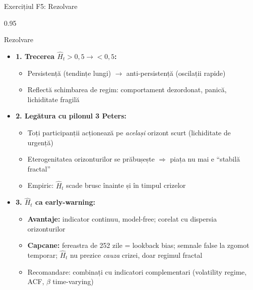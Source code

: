 \documentclass[9pt, aspectratio=169, t]{beamer}
\begin{document}
\begin{frame}[shrink=25]{Exercițiul F5: Rezolvare}
\begin{cminipage}{0.95\textwidth}
\begin{exampleblock}{Rezolvare}
\begin{itemize}\setlength{\itemsep}{0pt}
    \item \textbf{1. Trecerea $\hat H_t > 0{,}5 \to < 0{,}5$:}
    \begin{itemize}\setlength{\itemsep}{0pt}
        \item Persistență (tendințe lungi) $\to$ anti-persistență (oscilații rapide)
        \item Reflectă schimbarea de regim: comportament dezordonat, panică, lichiditate fragilă
    \end{itemize}
    \item \textbf{2. Legătura cu pilonul 3 Peters:}
    \begin{itemize}\setlength{\itemsep}{0pt}
        \item Toți participanții acționează pe \emph{același} orizont scurt (lichiditate de urgență)
        \item Eterogenitatea orizonturilor se prăbușește $\Rightarrow$ piața nu mai e ``stabilă fractal''
        \item Empiric: $\hat H_t$ scade brusc înainte și în timpul crizelor
    \end{itemize}
    \item \textbf{3. $\hat H_t$ ca early-warning:}
    \begin{itemize}\setlength{\itemsep}{0pt}
        \item \textbf{Avantaje:} indicator continuu, model-free; corelat cu dispersia orizonturilor
        \item \textbf{Capcane:} fereastra de 252 zile = lookback bias; semnale false la zgomot temporar; $\hat H_t$ nu prezice \emph{cauza} crizei, doar regimul fractal
        \item Recomandare: combinați cu indicatori complementari (volatility regime, ACF, $\beta$ time-varying)
    \end{itemize}
\end{itemize}
\end{exampleblock}
\end{cminipage}
\end{frame}
\end{document}
